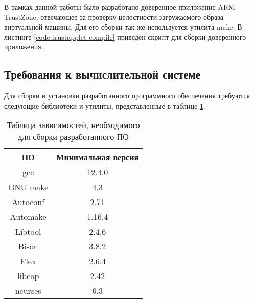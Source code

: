
В рамках данной работы было разработано доверенное приложение ARM TrustZone, отвечающее за проверку целостности загружаемого образа виртуальной машины. Для его сборки так же используется утилита make. В листинге \ref{code:trustapplet-compile} приведен скрипт для сборки доверенного приложения.


\subsection{Требования к вычислительной системе}

Для сборки и установки разработанного программного обеспечения требуются следующие библиотеки и утилиты, представленные в таблице \ref{table:dependencies}.

\begin{table}[!htb]
	\label{table:dependencies}
	\begin{center}
		\caption{Таблица зависимостей, необходимого для сборки разработанного ПО}
		\begin{tabular}{|c|c|}
			\hline
			\bfseries ПО & \bfseries Минимальная версия \\
			\hline
			gcc & 12.4.0 \\ \hline
			GNU make & 4.3 \\ \hline
			Autoconf & 2.71 \\ \hline
			Automake & 1.16.4 \\ \hline
			Libtool & 2.4.6 \\ \hline
			Bison & 3.8.2 \\ \hline
			Flex & 2.6.4 \\ \hline
			libcap & 2.42 \\ \hline
			ncurses & 6.3 \\
			\hline
		\end{tabular}
	\end{center}
\end{table}

